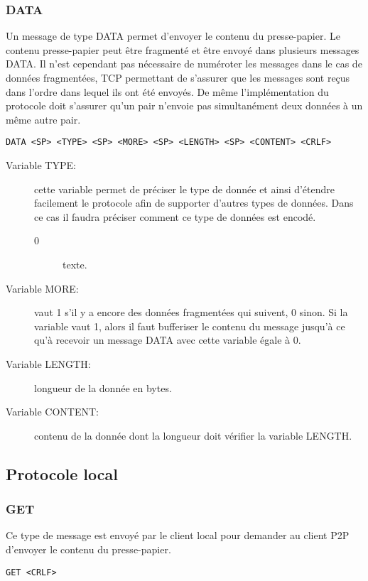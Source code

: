 \subsubsection*{DATA}
Un message de type DATA permet d'envoyer le contenu du presse-papier.
Le contenu presse-papier peut être fragmenté et être envoyé dans plusieurs
messages DATA. Il n'est cependant pas
nécessaire de numéroter les messages dans le cas de données fragmentées,
TCP permettant de s'assurer que les messages sont reçus dans l'ordre
dans lequel ils ont été envoyés. De même l'implémentation du protocole doit
s'assurer qu'un pair n'envoie pas simultanément deux données à un même autre
pair.
\begin{verbatim}
DATA <SP> <TYPE> <SP> <MORE> <SP> <LENGTH> <SP> <CONTENT> <CRLF>
\end{verbatim}
\begin{description}
\item[Variable TYPE:] cette variable permet de préciser le type
  de donnée et ainsi d'étendre facilement le protocole afin de supporter
  d'autres types de données. Dans ce cas il faudra préciser comment ce type
  de données est encodé.
  \begin{description}
  \item[0] texte.
  \end{description}
\item[Variable MORE:] vaut 1 s'il y a encore des données fragmentées qui
  suivent, 0 sinon.
  Si la variable vaut 1, alors il faut bufferiser le contenu du message
  jusqu'à ce qu'à recevoir un message DATA avec cette variable égale à 0.
\item[Variable LENGTH:] longueur de la donnée en bytes.
\item[Variable CONTENT:] contenu de la donnée dont la longueur
  doit vérifier la variable LENGTH.
\end{description}

\subsection{Protocole local}
\subsubsection*{GET}
Ce type de message est envoyé par le client local pour demander au client P2P
d'envoyer le contenu du presse-papier.
\begin{verbatim}
GET <CRLF>
\end{verbatim}

